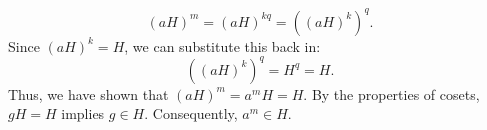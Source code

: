 \documentclass[12pt, oneside]{book}
\begin{document}
\begin{enumerate}
{        \[
            (aH)^{m} = (aH)^{kq} = \left((aH)^{k}\right)^{q}.
        \]
        Since \((aH)^{k} = H\), we can substitute this back in:
        \[
            \left((aH)^{k}\right)^{q} = H^{q} = H.
        \]
        Thus, we have shown that \((aH)^{m} = a^{m}H = H\). By the properties of cosets, \(gH = H\) implies \(g \in H\). Consequently, \(a^{m} \in H\).
    }


\end{enumerate}


\end{document}
